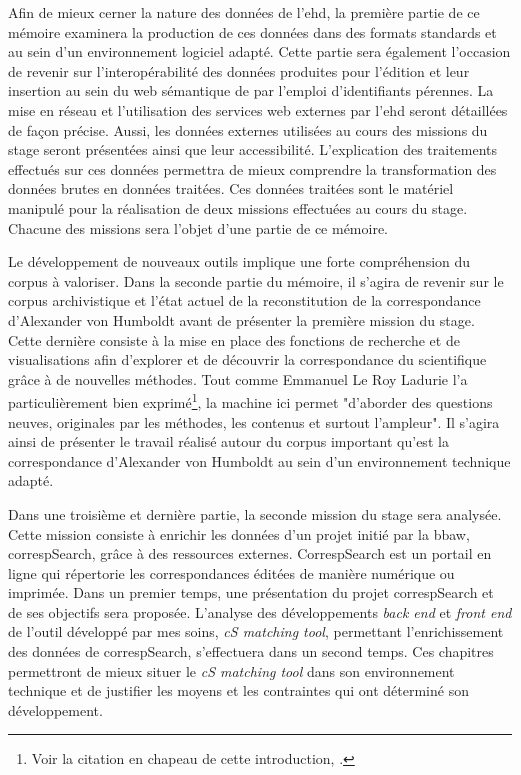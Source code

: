 \documentclass[a4paper, 12pt, twoside]{book}
\begin{document}
Afin de mieux cerner la nature des données de l'\gls{ehd}, la première partie de ce mémoire examinera la production de ces données dans des formats standards et au sein d'un environnement logiciel adapté. Cette partie sera également l'occasion de revenir sur l'interopérabilité des données produites pour l'édition et leur insertion au sein du web sémantique de par l'emploi d'identifiants pérennes. La mise en réseau et l'utilisation des services web externes par l'\gls{ehd} seront détaillées de façon précise. Aussi, les données externes utilisées au cours des missions du stage seront présentées ainsi que leur accessibilité. L'explication des traitements effectués sur ces données permettra de mieux comprendre la transformation des données brutes en données traitées. Ces données traitées sont le matériel manipulé pour la réalisation de deux missions effectuées au cours du stage. Chacune des missions sera l'objet d'une partie de ce mémoire. 

Le développement de nouveaux outils implique une forte compréhension du corpus à valoriser. Dans la seconde partie du mémoire, il s'agira de revenir sur le corpus archivistique et l'état actuel de la reconstitution de la correspondance d'Alexander von Humboldt avant de présenter la première mission du stage. Cette dernière consiste à la mise en place des fonctions de recherche et de visualisations afin d'explorer et de découvrir la correspondance du scientifique grâce à de nouvelles méthodes. Tout comme Emmanuel Le Roy Ladurie l'a particulièrement bien exprimé\footnote{Voir la citation en chapeau de cette introduction, \cite{le_roy_ladurie_fin_1968}.}, la machine ici permet "d'aborder des questions neuves, originales par les méthodes, les contenus et surtout l'ampleur". Il s'agira ainsi de présenter le travail réalisé autour du corpus important qu'est la correspondance d'Alexander von Humboldt au sein d'un environnement technique adapté. 

Dans une troisième et dernière partie, la seconde mission du stage sera analysée. Cette mission consiste à enrichir les données d'un projet initié par la \gls{bbaw}, correspSearch, grâce à des ressources externes. CorrespSearch est un portail en ligne qui répertorie les correspondances éditées de manière numérique ou imprimée. Dans un premier temps, une présentation du projet correspSearch et de ses objectifs sera proposée. L'analyse des développements \textit{back end} et \textit{front end} de l'outil développé par mes soins, \textit{cS matching tool}, permettant l'enrichissement des données de correspSearch, s'effectuera dans un second temps. Ces chapitres permettront de mieux situer le \textit{cS matching tool} dans son environnement technique et de justifier les moyens et les contraintes qui ont déterminé son développement. 
\end{document}
